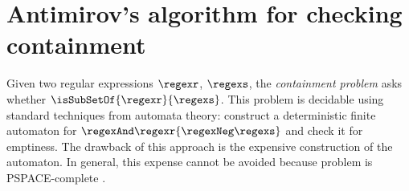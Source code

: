 \section{Antimirov's algorithm for checking containment}
\label{sec:antimirovs-algorithm-containment}

Given two regular expressions $\regexr$, $\regexs$, the
\emph{containment problem} asks whether
$\isSubSetOf{\regexr}{\regexs}$.
This problem is decidable using standard techniques 
from automata theory: construct a deterministic finite
automaton for $\regexAnd\regexr{\regexNeg\regexs}$ and check it for
emptiness. The drawback of this approach is the expensive construction
of the automaton. In general, this expense cannot be avoided because
problem is PSPACE-complete 
\cite{HuntRosenkrantzSzymanski1976,JiangRavikumar1993,MeyerStockmeyer1972}.

